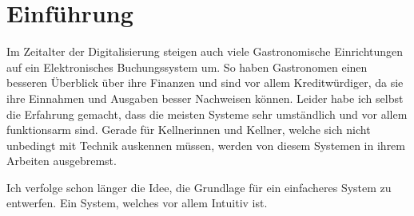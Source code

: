 \section{Einführung}

Im Zeitalter der Digitalisierung steigen auch viele Gastronomische Einrichtungen auf ein Elektronisches Buchungssystem um. So haben Gastronomen einen besseren Überblick über ihre Finanzen und sind vor allem Kreditwürdiger, da sie ihre Einnahmen und Ausgaben besser Nachweisen können. Leider habe ich selbst die Erfahrung gemacht, dass die meisten Systeme sehr umständlich und vor allem funktionsarm sind. Gerade für Kellnerinnen und Kellner, welche sich nicht unbedingt mit Technik auskennen müssen, werden von diesem Systemen in ihrem Arbeiten ausgebremst. 

Ich verfolge schon länger die Idee, die Grundlage für ein einfacheres System zu entwerfen. Ein System, welches vor allem Intuitiv ist. 